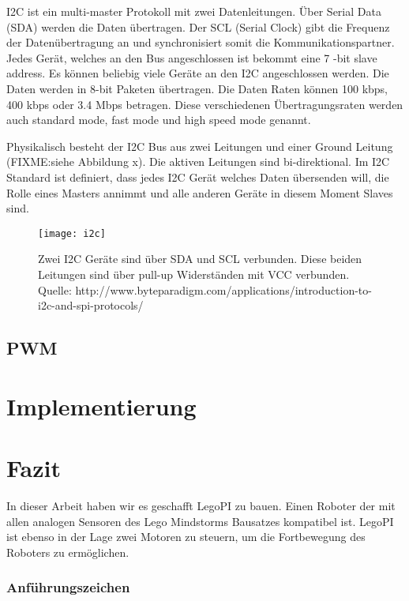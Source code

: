 I2C ist ein multi-master Protokoll mit zwei Datenleitungen. Über Serial Data (SDA) werden die Daten übertragen. Der SCL (Serial Clock) gibt die Frequenz der Datenübertragung an und synchronisiert somit die Kommunikationspartner. Jedes Gerät, welches an den Bus angeschlossen ist bekommt eine 7 -bit slave address. Es können beliebig viele Geräte an den I2C angeschlossen werden. Die Daten werden in 8-bit Paketen übertragen. Die Daten Raten können 100 kbps, 400 kbps oder 3.4 Mbps betragen. Diese verschiedenen Übertragungsraten werden auch standard mode, fast mode und high speed mode genannt.

Physikalisch besteht der I2C Bus aus zwei Leitungen und einer Ground Leitung (FIXME:siehe Abbildung x). Die aktiven Leitungen sind bi-direktional. Im I2C Standard ist definiert, dass jedes I2C Gerät welches Daten übersenden will, die Rolle eines Masters annimmt und alle anderen Geräte in diesem Moment Slaves sind.

\begin{figure}[h]
  \centering
  \texttt{[image: i2c]}
  \caption{Zwei I2C Geräte sind über SDA und SCL verbunden. Diese beiden Leitungen sind über pull-up Widerständen mit VCC verbunden. Quelle: http://www.byteparadigm.com/applications/introduction-to-i2c-and-spi-protocols/}
  \label{Kap1:I2C}
\end{figure}

\section{PWM}

\chapter{Implementierung}

\chapter{Fazit}

In dieser Arbeit haben wir es geschafft LegoPI zu bauen. Einen Roboter der mit allen analogen Sensoren des Lego Mindstorms Bausatzes kompatibel ist. LegoPI ist ebenso in der Lage zwei Motoren zu steuern, um die Fortbewegung des Roboters zu ermöglichen.



\subsection{Anführungszeichen}


